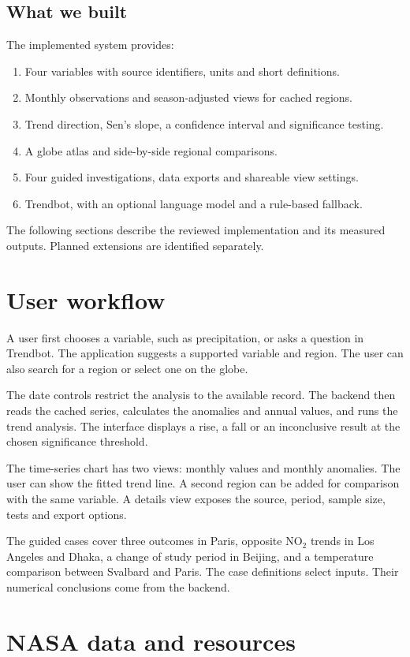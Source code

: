 \documentclass[10pt,a4paper,twocolumn]{article}
\begin{document}
\subsection{What we built}
The implemented system provides:
\begin{enumerate}
\item Four variables with source identifiers, units and short definitions.
\item Monthly observations and season-adjusted views for cached regions.
\item Trend direction, Sen's slope, a confidence interval and significance testing.
\item A globe atlas and side-by-side regional comparisons.
\item Four guided investigations, data exports and shareable view settings.
\item Trendbot, with an optional language model and a rule-based fallback.
\end{enumerate}
The following sections describe the reviewed implementation and its measured outputs. Planned extensions are identified separately.

\section{User workflow}
A user first chooses a variable, such as precipitation, or asks a question in Trendbot. The application suggests a supported variable and region. The user can also search for a region or select one on the globe.

The date controls restrict the analysis to the available record. The backend then reads the cached series, calculates the anomalies and annual values, and runs the trend analysis. The interface displays a rise, a fall or an inconclusive result at the chosen significance threshold.

The time-series chart has two views: monthly values and monthly anomalies. The user can show the fitted trend line. A second region can be added for comparison with the same variable. A details view exposes the source, period, sample size, tests and export options.

The guided cases cover three outcomes in Paris, opposite NO$_2$ trends in Los Angeles and Dhaka, a change of study period in Beijing, and a temperature comparison between Svalbard and Paris. The case definitions select inputs. Their numerical conclusions come from the backend.

\section{NASA data and resources}
\end{document}
